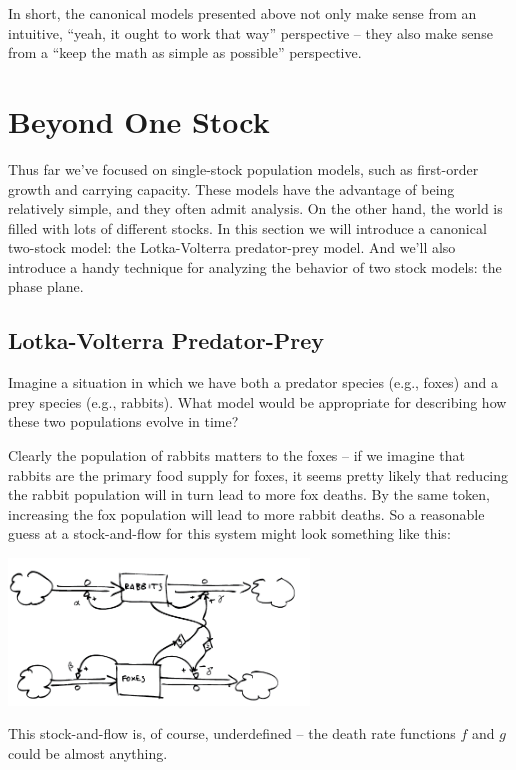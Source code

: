 \documentclass{tufte-handout}
\begin{document}
In short, the canonical models presented above not only make sense from an intuitive, ``yeah, it ought to work that way'' perspective -- they also make sense from a ``keep the math as simple as possible'' perspective.

\section*{Beyond One Stock}

Thus far we've focused on single-stock population models, such as first-order growth and carrying capacity.  These models have the advantage of being relatively simple, and they often admit analysis.  On the other hand, the world is filled with lots of different stocks.  In this section we will introduce a canonical two-stock model:  the Lotka-Volterra predator-prey model.  And we'll also introduce a handy technique for analyzing the behavior of two stock models:  the phase plane.

\subsection*{Lotka-Volterra Predator-Prey}

Imagine a situation in which we have both a predator  species (e.g., foxes) and a prey species (e.g., rabbits).  What model would be appropriate for describing how these two populations evolve in time?

Clearly the population of rabbits matters to the foxes -- if we imagine that rabbits are the primary food supply for foxes, it seems pretty likely that reducing the rabbit population will in turn lead to more fox deaths.  By the same token, increasing the fox population will lead to more rabbit deaths.  So a reasonable guess at a stock-and-flow for this system might look something like this:

\centerline{\includegraphics[width=8cm]{figs/RabbitFoxStockAndFlow.png}}

This stock-and-flow is, of course, underdefined -- the death rate functions $f$ and $g$ could be almost anything.
\end{document}
